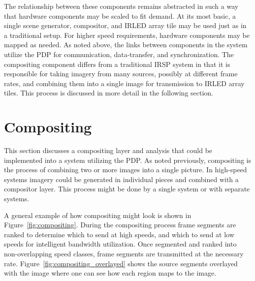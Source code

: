     The relationship between these components remains abstracted in such a way that hardware components may be scaled to fit demand. At its most basic, a single scene generator, compositor, and IRLED array tile may be used just as in a traditional setup. For higher speed requirements, hardware components may be mapped as needed. As noted above, the links between components in the system utilize the PDP for communication, data-transfer, and synchronization. The compositing component differs from a traditional IRSP system in that it is responsible for taking imagery from many sources, possibly at different frame rates, and combining them into a single image for transmission to IRLED array tiles. This process is discussed in more detail in the following section.

\section{Compositing}
    \label{sec:compositing}
    This section discusses a compositing layer and analysis that could be implemented into a system utilizing the PDP. As noted previously, compositing is the process of combining two or more images into a single picture. In high-speed systems imagery could be generated in individual pieces and combined with a compositor layer. This process might be done by a single system or with separate systems.

    A general example of how compositing might look is shown in Figure~\ref{fig:compositing}. During the compositing process frame segments are ranked to determine which to send at high speeds, and which to send at low speeds for intelligent bandwidth utilization. Once segmented and ranked into non-overlapping speed classes, frame segments are transmitted at the necessary rate. Figure~\ref{fig:compositing_overlayed} shows the source segments overlayed with the image where one can see how each region maps to the image.

